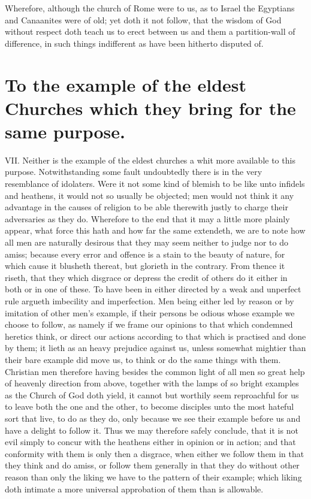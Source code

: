 Wherefore, although the church of Rome were to us, as to Israel the Egyptians and Canaanites were of old; yet doth it not follow, that the wisdom of God without respect doth teach us to erect between us and them a partition-wall of difference, in such things indifferent as have been hitherto disputed of.

\section*{To the example of the eldest Churches which they bring for the same purpose.}

VII. Neither is the example of the eldest churches a whit more available to this purpose. Notwithstanding some fault undoubtedly there is in the very resemblance of idolaters. Were it not some kind of blemish to be like unto infidels and heathens, it would not so usually be objected; men would not think it any advantage in the causes of religion to be able therewith justly to charge their adversaries as they do. Wherefore to the end that it may a little more plainly appear, what force this hath and how far the same extendeth, we are to note how all men are naturally desirous that they may seem neither to judge nor to do amiss; because every error and offence is a stain to the beauty of nature, for which cause  it blusheth thereat, but glorieth in the contrary. From thence it riseth, that they which disgrace or depress the credit of others do it either in both or in one of these. To have been in either directed by a weak and unperfect rule argueth imbecility and imperfection. Men being either led by reason or by imitation of other men’s example, if their persons be odious whose example we choose to follow, as namely if we frame our opinions to that which condemned heretics think, or direct our actions according to that which is practised and done by them; it lieth as an heavy prejudice against us, unless somewhat mightier than their bare example did move us, to think or do the same things with them. Christian men therefore having besides the common light of all men so great help of heavenly direction from above, together with the lamps of so bright examples as the Church of God doth yield, it cannot but worthily seem reproachful for us to leave both the one and the other, to become disciples unto the most hateful sort that live, to do as they do, only because we see their example before us and have a delight to follow it. Thus we may therefore safely conclude, that it is not evil simply to concur with the heathens either in opinion or in action; and that conformity with them is only then a disgrace, when either we follow them in that they think and do amiss, or follow them generally in that they do without other reason than only the liking we have to the pattern of their example; which liking doth intimate a more universal approbation of them than is allowable.

